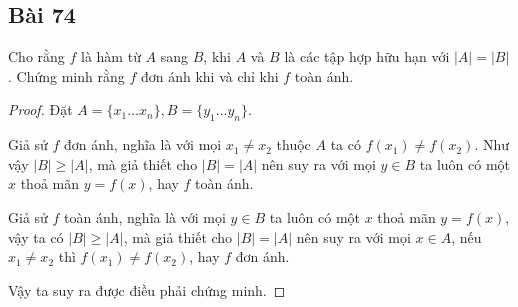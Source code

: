 \subsection*{Bài 74}
Cho rằng $f$ là hàm từ $A$ sang $B$, khi $A$ và $B$ là các tập hợp hữu hạn với $|A|=|B|$. Chứng minh rằng $f$ đơn ánh khi và chỉ khi $f$ toàn ánh.
\begin{proof}
    Đặt $A=\{x_1\dots x_n\},B=\{y_1\dots y_n\}$.
    \par Giả sử $f$ đơn ánh, nghĩa là với mọi $x_1\neq x_2$ thuộc $A$ ta có $f(x_1)\neq f(x_2)$. Như vậy $|B|\geq|A|$, mà giả thiết cho $|B|=|A|$ nên suy ra với mọi $y\in B$ ta luôn có một $x$ thoả mãn $y=f(x)$, hay $f$ toàn ánh.
    \par Giả sử $f$ toàn ánh, nghĩa là với mọi $y\in B$ ta luôn có một $x$ thoả mãn $y=f(x)$, vậy ta có $|B|\geq|A|$, mà giả thiết cho $|B|=|A|$ nên suy ra với mọi $x\in A$, nếu $x_1\neq x_2$ thì $f(x_1)\neq f(x_2)$, hay $f$ đơn ánh.
    \par Vậy ta suy ra được điều phải chứng minh.
\end{proof}
